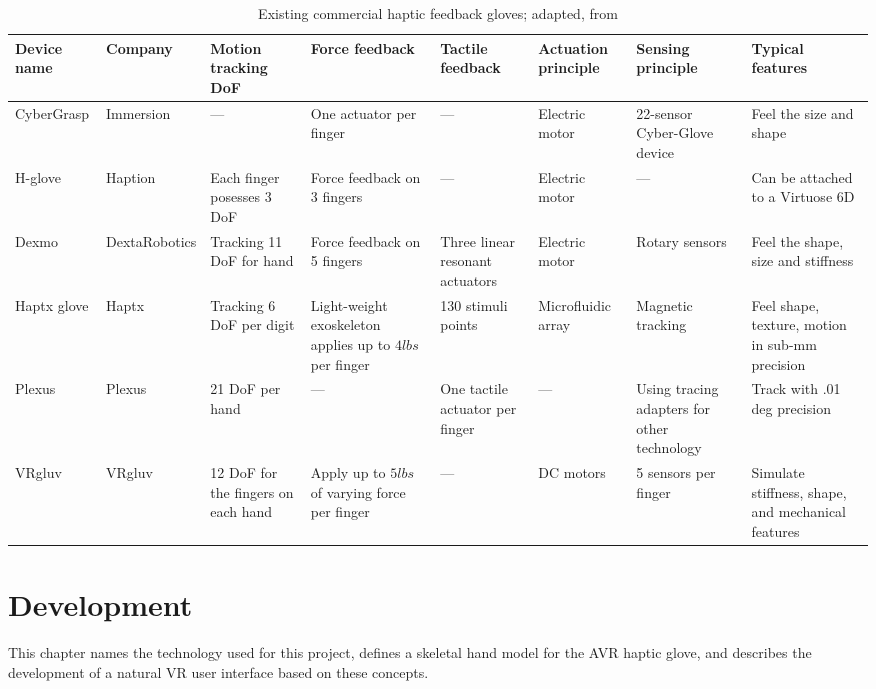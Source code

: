 \documentclass[hyperref, bachelorofscience]{cgvpub}
\begin{document}
\begin{table}
	\footnotesize
	\centering
	\begin{tabularx}{\textwidth}{llXXXXXX}		
		\toprule[2pt] \midrule
		Device name & Company & Motion tracking DoF & Force feedback & Tactile feedback & Actuation principle & Sensing principle & Typical features\\
		\midrule
		CyberGrasp & Immersion & --- & One actuator per finger & --- & Electric motor & 22-sensor Cyber-Glove device & Feel the size and shape \\
		\midrule
		H-glove & Haption & Each finger posesses 3 DoF & Force feedback on 3 fingers & --- & Electric motor & --- & Can be attached to a Virtuose 6D\\
		\midrule
		Dexmo & DextaRobotics & Tracking 11 DoF for hand & Force feedback on 5 fingers & Three linear resonant actuators & Electric motor & Rotary sensors & Feel the shape, size and stiffness \\
		\midrule
		Haptx glove & Haptx & Tracking 6 DoF per digit & Light-weight exoskeleton applies up to $ 4lbs $ per finger & 130 stimuli points & Microfluidic array & Magnetic tracking & Feel shape, texture, motion in sub-mm precision\\
		\midrule
		Plexus & Plexus & 21 DoF per hand & --- & One tactile actuator per finger & --- & Using tracing adapters for other technology & Track with .01 deg precision\\
		\midrule
		VRgluv & VRgluv & 12 DoF for the fingers on each hand & Apply up to $ 5lbs $ of varying force per finger & --- & DC motors & 5 sensors per finger & Simulate stiffness, shape, and mechanical features\\
		\midrule \bottomrule[2pt]
	\end{tabularx}
	\caption{Existing commercial haptic feedback gloves; adapted, from \cite{wang19}}
	\label{tab:commercial_gloves}
\end{table}

\chapter{Development} \label{ch:devel}
This chapter names the technology used for this project, defines a skeletal hand model for the \Gls{AVR} haptic glove, and describes the development of a natural VR user interface based on these concepts. 
\end{document}
